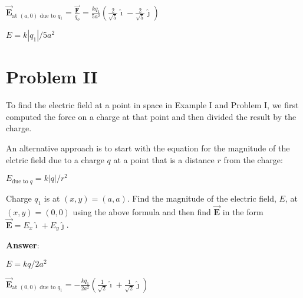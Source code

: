 \documentclass{article}
\newcommand{\ds}[0]{\displaystyle}
\newcommand{\ihat}[0]{\hat{\boldsymbol{\imath}}}
\newcommand{\jhat}[0]{\hat{\boldsymbol{\jmath}}}
\newcommand{\bfvec}[1]{\vec{\mathbf{#1}}}
\begin{document}
$\ds\bfvec{E}_{\text{at }(a,0) \text{ due to }q_1} = \frac{\bfvec{F}}{q_o}=\frac{kq_1}{5a^2}\left(\frac{2}{\sqrt{5}}\ihat -\frac{2}{\sqrt{5}}\jhat\right)$

$E = k|q_1|/5a^2$
\else


\fi

\newpage

\section{Problem II}

To find the electric field at a point in space in Example I and Problem I, we first computed the force on a charge at that point and then divided the result by the charge.

An alternative approach is to start with the equation for the magnitude of the elctric field due to a charge $q$ at a point that is a distance $r$ from the charge:

$E_{\text{due to }q}=k{|q|}/{r^2}$

Charge $q_1$ is at $(x,y)=(a, a)$. Find the magnitude of the electric field, $E$, at $(x,y)=(0, 0)$ using the above formula and then find $\bfvec{E}$ in the form $\bfvec{E}=E_x\ihat + E_y\jhat$.

\ifsolutions
{\bf Answer}:

$E = kq/2a^2$

$\ds\bfvec{E}_{\text{at }(0,0) \text{ due to }q_1}=-\frac{kq_1}{2a^2}\left(\frac{1}{\sqrt{2}}\ihat +\frac{1}{\sqrt{2}}\jhat\right)$
\else


\fi
\end{document}
